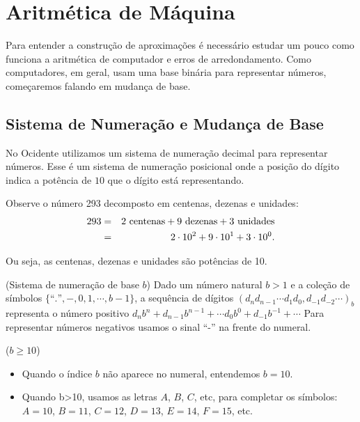 \chapter{Aritmética de Máquina}
Para entender a construção de aproximações é necessário estudar um pouco como funciona a aritmética de computador e erros de arredondamento. Como computadores, em geral, usam uma base binária para representar números, começaremos falando em mudança de base.

\section{Sistema de Numeração e Mudança de Base}
No Ocidente utilizamos um sistema de numeração decimal para representar números. Esse é um sistema de numeração posicional onde a posição do dígito indica a potência de $10$ que o dígito está representando.

\begin{ex}
  Observe o número 293 decomposto em centenas, dezenas e unidades:
  \begin{eqnarray*}
    293 &=& 2\ \hbox{centenas} + 9\ \hbox{dezenas} + 3\ \hbox{unidades}\\
        &=& 2\cdot 10^2 + 9\cdot 10^1 + 3\cdot 10^0.
  \end{eqnarray*}

Ou seja, as centenas, dezenas e unidades são potências de 10.
\end{ex}

\begin{defn}(Sistema de numeração de base $b$)
Dado um número natural $b>1$ e  a coleção de símbolos $\{\text{``.''}, - ,0, 1, \cdots, b-1\}$, a sequência de dígitos
$
(d_nd_{n-1}\cdots d_1d_0,d_{-1}d_{-2}\cdots)_b
$
representa o número positivo
$
d_nb^n+d_{n-1}b^{n-1}+\cdots d_0b^0+d_{-1}b^{-1}+\cdots
$
Para representar números negativos usamos o sinal ``-'' na frente do numeral.
\end{defn}

\begin{obs}($b\geq 10$)

\begin{itemize}
\item Quando o índice $b$ não aparece no numeral, entendemos $b=10$.
\item Quando b>10, usamos as letras $A$, $B$, $C$, etc, para completar os símbolos: $A=10$, $B=11$, $C=12$, $D=13$, $E=14$, $F=15$, etc.
\end{itemize}
\end{obs}

